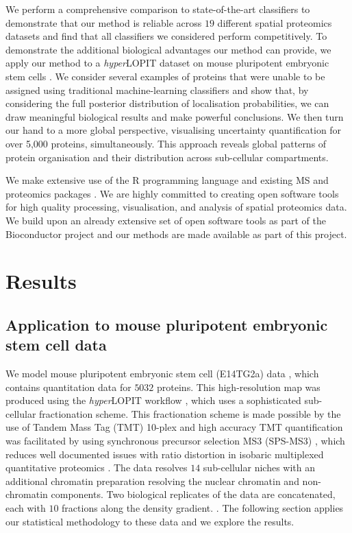 \documentclass[12pt,english]{article}\usepackage[]{graphicx}\usepackage[]{color}
\begin{document}
We perform a comprehensive comparison to state-of-the-art classifiers
to demonstrate that our method is reliable across $19$ different
spatial proteomics datasets and find that all classifiers we
considered perform competitively. To demonstrate the additional
biological advantages our method can provide, we apply our method to a
\textit{hyper}LOPIT dataset on mouse pluripotent embryonic stem cells
\citep{hyper}. We consider several examples of proteins that were
unable to be assigned using traditional machine-learning classifiers
and show that, by considering the full posterior distribution of
localisation probabilities, we can draw meaningful biological results
and make powerful conclusions. We then turn our hand to a more global
perspective, visualising uncertainty quantification for over 5,000
proteins, simultaneously. This approach reveals global patterns of
protein organisation and their distribution across sub-cellular
compartments.

We make extensive use of the R programming language \citep{R} and
existing MS and proteomics packages \citep{MSnbase:2012,
  pRoloc:2014}. We are highly committed to creating open software
tools for high quality processing, visualisation, and analysis of
spatial proteomics data.  We build upon an already extensive set of
open software tools \citep{pRoloc:2014} as part of the Bioconductor
project \citep{Bioconductor::2004, Huber::2015} and our methods are
made available as part of this project.

\section*{Results}

\subsection*{Application to mouse pluripotent embryonic stem cell data}

We model mouse pluripotent embryonic stem cell (E14TG2a) data
\citep{hyper}, which contains quantitation data for $5032$
proteins. This high-resolution map was produced using the
\textit{hyper}LOPIT workflow \citep{Mulvey:2017}, which uses a
sophisticated sub-cellular fractionation scheme. This fractionation
scheme is made possible by the use of Tandem Mass Tag (TMT) 10-plex
and high accuracy TMT quantification was facilitated by using
synchronous precursor selection MS3 (SPS-MS3) \citep{Mcalister::2014},
which reduces well documented issues with ratio distortion in
isobaric multiplexed quantitative proteomics \citep{Ting:2011}. The
data resolves $14$ sub-cellular niches with an additional chromatin
preparation resolving the nuclear chromatin and non-chromatin
components. Two biological replicates of the data are concatenated,
each with $10$ fractions along the density gradient. {}. The following
section applies our statistical methodology to these data and we
explore the results.
\end{document}

